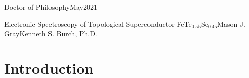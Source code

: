 \documentclass[reqno,12pt,oneside]{report} %
\begin{document}
{Doctor of Philosophy}{May}{2021}

\initializefrontsections



\makeatletter
\if@twoside \setcounter{page}{4} \else \setcounter{page}{1} \fi
\makeatother

\startabstractpage
{Electronic Spectroscopy of Topological Superconductor FeTe$_{0.55}$Se$_{0.45}$}{Mason J. Gray}{Kenneth S. Burch, Ph.D.}

\label{Abstract}


%

\tableofcontents     %
\listoffigures       %
\listofabbreviations %

\startacknowledgementspage

\label{Acknowledgements}

\startthechapters

\chapter{Introduction}
\label{chap:Intro}

\end{document}
